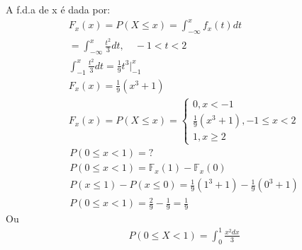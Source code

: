 \begin{description}
     A f.d.a de x é dada por: 
     \begin{align*}
       F_{x}(x)= P(X \le x)= \int_{-\infty}^{x} f_{x}(t) dt\\
       = \int_{-\infty}^{x} \frac{t^2}{3} dt , \quad -1<t<2 \\
       \int_{-1}^{x} \frac{t^2}{3} dt= \frac{1}{9} t^3 |^x_{-1}\\
       F_{x}(x)= \frac{1}{9}(x^3 +1)\\
       F_{x}(x)=P(X \le x)= 
       \begin{cases}
         0, x <-1 \\
         \frac{1}{9}(x^3 +1) , -1 \le x <2 \\
         1, x \geq 2
       \end{cases}
     \end{align*}
     \begin{align*}
       P(0 \le x <1)=? \\
       P(0 \le x <1)= \mathbb{F}_{x}(1)- \mathbb{F}_{x}(0)\\
       P(x \le 1 ) - P(x \le 0)= \frac{1}{9} (1^3 + 1 ) - \frac{1}{9}(0^3+ 1)\\
       P(0 \le x < 1 )= \frac{2}{9} - \frac{1}{9} = \frac{1}{9}
     \end{align*}
     Ou 
     \begin{align*}
       P(0 \leq X < 1) = \int_{0}^{1} \frac{x^2 dx}{3} 
     \end{align*}
 \end{description}
